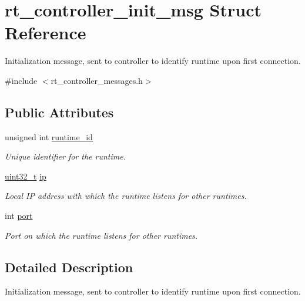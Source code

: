 \hypertarget{structrt__controller__init__msg}{\section{rt\-\_\-controller\-\_\-init\-\_\-msg Struct Reference}
\label{structrt__controller__init__msg}
}


Initialization message, sent to controller to identify runtime upon first connection.  




{\ttfamily \#include $<$rt\-\_\-controller\-\_\-messages.\-h$>$}

\subsection*{Public Attributes}
\begin{DoxyCompactItemize}
\item 
unsigned int \hyperlink{structrt__controller__init__msg_a97110c58e5b06491f20f50ae3712fd75}{runtime\-\_\-id}
\begin{DoxyCompactList}\small\item\em Unique identifier for the runtime. \end{DoxyCompactList}\item 
\hyperlink{msus_2webserver_2uthash_8h_a435d1572bf3f880d55459d9805097f62}{uint32\-\_\-t} \hyperlink{structrt__controller__init__msg_a9cf153e2f8ab32bc6458db829d6583ce}{ip}
\begin{DoxyCompactList}\small\item\em Local I\-P address with which the runtime listens for other runtimes. \end{DoxyCompactList}\item 
int \hyperlink{structrt__controller__init__msg_ab269a1da6a3fc076d8183244b7efbb24}{port}
\begin{DoxyCompactList}\small\item\em Port on which the runtime listens for other runtimes. \end{DoxyCompactList}\end{DoxyCompactItemize}


\subsection{Detailed Description}
Initialization message, sent to controller to identify runtime upon first connection. 

